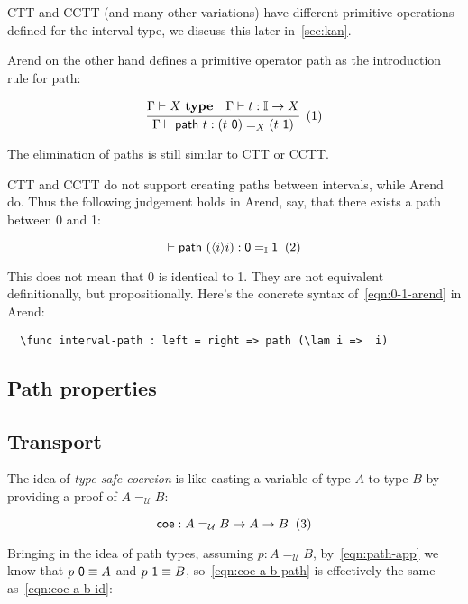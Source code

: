 CTT and CCTT (and many other variations) have different primitive
operations defined for the interval type,
we discuss this later in~\cref{sec:kan}.

Arend on the other hand defines a primitive operator \textsf{path}
as the introduction rule for path:

\[
  \cfrac{
    \Gamma \vdash X \ \textbf{type}
    \quad
    \Gamma \vdash t : \mathbb I \rightarrow X
  }{
    \Gamma \vdash \textsf{path} \ t : (t \ \textsf 0) =_X (t \ \textsf 1)
  }
  \xtag
\]

The elimination of paths is still similar to CTT or CCTT.

CTT and CCTT do not support creating paths between intervals,
while Arend do.
Thus the following judgement holds in Arend, say,
that there exists a path between \textsf 0 and \textsf 1:

\[
  \vdash \textsf{path}\ (\lrangle i i) : \textsf 0 =_{\mathbb I} \textsf 1
  \xtag \label{eqn:0-1-arend}
\]

This does not mean that \textsf 0 is identical to \textsf 1.
They are not equivalent definitionally, but propositionally.
Here's the concrete syntax of~\ref{eqn:0-1-arend} in Arend:

\begin{verbatim}
  \func interval-path : left = right => path (\lam i =>  i)
\end{verbatim}

\subsection{Path properties}
\label{subsec:path-prop}


\subsection{Transport}
\label{subsec:coe}

The idea of \textit{type-safe coercion} is like
casting a variable of type $A$ to type $B$ by providing a proof
of $A =_{\mathcal U} B$:

\[
  \textsf{coe} : A =_{\mathcal U} B \rightarrow A \rightarrow B
  \xtag \label{eqn:coe-a-b-id}
\]

Bringing in the idea of path types,
assuming $p : A =_{\mathcal U} B$, by~\ref{eqn:path-app}
we know that $p \ \textsf 0 \equiv A$ and
$p \ \textsf 1 \equiv B$,
so~\ref{eqn:coe-a-b-path} is effectively the same
as~\ref{eqn:coe-a-b-id}:

